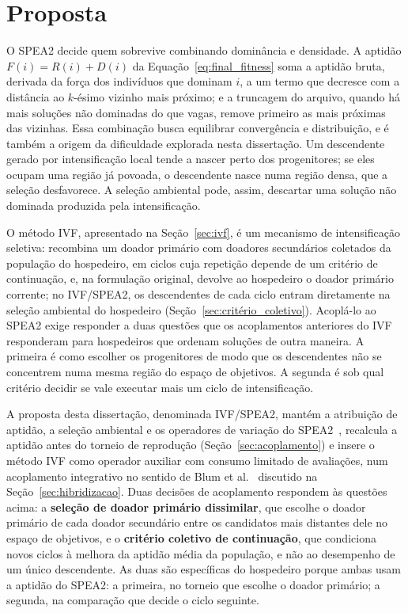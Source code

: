 \chapter{Proposta}
\label{sec:Proposal}

O SPEA2 decide quem sobrevive combinando dominância e densidade. A aptidão $F(i) = R(i) + D(i)$ da Equação~\ref{eq:final_fitness} soma a aptidão bruta, derivada da força dos indivíduos que dominam $i$, a um termo que decresce com a distância ao $k$-ésimo vizinho mais próximo; e a truncagem do arquivo, quando há mais soluções não dominadas do que vagas, remove primeiro as mais próximas das vizinhas. Essa combinação busca equilibrar convergência e distribuição, e é também a origem da dificuldade explorada nesta dissertação. Um descendente gerado por intensificação local tende a nascer perto dos progenitores; se eles ocupam uma região já povoada, o descendente nasce numa região densa, que a seleção desfavorece. A seleção ambiental pode, assim, descartar uma solução não dominada produzida pela intensificação.

O método IVF, apresentado na Seção~\ref{sec:ivf}, é um mecanismo de intensificação seletiva: recombina um doador primário com doadores secundários coletados da população do hospedeiro, em ciclos cuja repetição depende de um critério de continuação, e, na formulação original, devolve ao hospedeiro o doador primário corrente; no IVF/SPEA2, os descendentes de cada ciclo entram diretamente na seleção ambiental do hospedeiro (Seção~\ref{sec:critério_coletivo}). Acoplá-lo ao SPEA2 exige responder a duas questões que os acoplamentos anteriores do IVF responderam para hospedeiros que ordenam soluções de outra maneira. A primeira é como escolher os progenitores de modo que os descendentes não se concentrem numa mesma região do espaço de objetivos. A segunda é sob qual critério decidir se vale executar mais um ciclo de intensificação.

A proposta desta dissertação, denominada IVF/SPEA2, mantém a atribuição de aptidão, a seleção ambiental e os operadores de variação do SPEA2~\cite{zitzler2001spea2}, recalcula a aptidão antes do torneio de reprodução (Seção~\ref{sec:acoplamento}) e insere o método IVF como operador auxiliar com consumo limitado de avaliações, num acoplamento integrativo no sentido de Blum et al.~\cite{blum2011hybrid} discutido na Seção~\ref{sec:hibridizacao}. Duas decisões de acoplamento respondem às questões acima: a \textbf{seleção de doador primário dissimilar}, que escolhe o doador primário de cada doador secundário entre os candidatos mais distantes dele no espaço de objetivos, e o \textbf{critério coletivo de continuação}, que condiciona novos ciclos à melhora da aptidão média da população, e não ao desempenho de um único descendente. As duas são específicas do hospedeiro porque ambas usam a aptidão do SPEA2: a primeira, no torneio que escolhe o doador primário; a segunda, na comparação que decide o ciclo seguinte.

